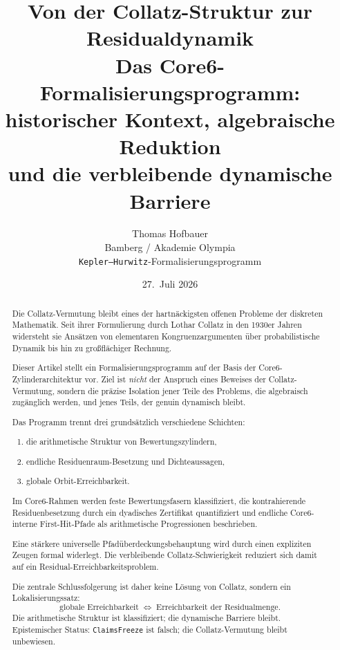 \documentclass[11pt,a4paper]{article}
\title{%
  Von der Collatz-Struktur zur Residualdynamik\\[0.35em]
  \large Das Core6-Formalisierungsprogramm:\\
  historischer Kontext, algebraische Reduktion\\
  und die verbleibende dynamische Barriere
}
\author{%
  Thomas Hofbauer\\
  \small Bamberg / Akademie Olympia\\
  \small\texttt{Kepler--Hurwitz}-Formalisierungsprogramm
}
\date{27.\ Juli 2026}
\theoremstyle{definition}
\theoremstyle{remark}
\begin{document}
\maketitle

\begin{abstract}
Die Collatz-Vermutung bleibt eines der hartnäckigsten offenen Probleme der
diskreten Mathematik. Seit ihrer Formulierung durch Lothar Collatz in den
1930er Jahren widersteht sie Ansätzen von elementaren Kongruenzargumenten
über probabilistische Dynamik bis hin zu großflächiger Rechnung.

Dieser Artikel stellt ein Formalisierungsprogramm auf der Basis der
Core6-Zylinderarchitektur vor. Ziel ist \emph{nicht} der Anspruch eines
Beweises der Collatz-Vermutung, sondern die präzise Isolation jener Teile
des Problems, die algebraisch zugänglich werden, und jenes Teils, der
genuin dynamisch bleibt.

Das Programm trennt drei grundsätzlich verschiedene Schichten:
\begin{enumerate}[leftmargin=*,itemsep=0.2em]
  \item die arithmetische Struktur von Bewertungszylindern,
  \item endliche Residuenraum-Besetzung und Dichteaussagen,
  \item globale Orbit-Erreichbarkeit.
\end{enumerate}
Im Core6-Rahmen werden feste Bewertungsfasern klassifiziert, die
kontrahierende Residuenbesetzung durch ein dyadisches Zertifikat
quantifiziert und endliche Core6-interne First-Hit-Pfade als
arithmetische Progressionen beschrieben.

Eine stärkere universelle Pfadüberdeckungsbehauptung wird durch einen
expliziten Zeugen formal widerlegt. Die verbleibende Collatz-Schwierigkeit
reduziert sich damit auf ein Residual-Erreichbarkeitsproblem.

Die zentrale Schlussfolgerung ist daher keine Lösung von Collatz, sondern
ein Lokalisierungssatz:
\[
  \text{globale Erreichbarkeit}
  \;\Longleftrightarrow\;
  \text{Erreichbarkeit der Residualmenge}.
\]
Die arithmetische Struktur ist klassifiziert; die dynamische Barriere bleibt.
Epistemischer Status: \texttt{ClaimsFreeze} ist falsch; die Collatz-Vermutung
bleibt unbewiesen.
\end{abstract}

\tableofcontents
\vspace{1em}

\end{document}
